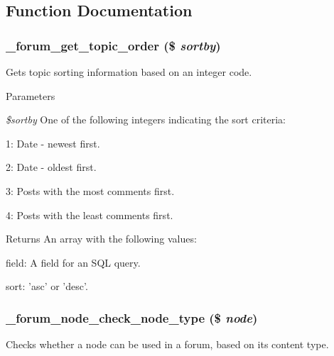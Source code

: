 \subsection{Function Documentation}
\hypertarget{forum_8module_af12b0115e4baa8f53be8041d7f0de0e4}{
\subsubsection[{\_\-forum\_\-get\_\-topic\_\-order}]{\setlength{\rightskip}{0pt plus 5cm}\_\-forum\_\-get\_\-topic\_\-order (\$ {\em sortby})}}
\label{forum_8module_af12b0115e4baa8f53be8041d7f0de0e4}
Gets topic sorting information based on an integer code.


\begin{DoxyParams}{Parameters}
\item[{\em \$sortby}]One of the following integers indicating the sort criteria:
\begin{DoxyItemize}
\item 1: Date -\/ newest first.
\item 2: Date -\/ oldest first.
\item 3: Posts with the most comments first.
\item 4: Posts with the least comments first.
\end{DoxyItemize}\end{DoxyParams}
\begin{DoxyReturn}{Returns}
An array with the following values:
\begin{DoxyItemize}
\item field: A field for an SQL query.
\item sort: 'asc' or 'desc'. 
\end{DoxyItemize}
\end{DoxyReturn}
\hypertarget{forum_8module_ab7c8bc1867b60dfb765b3cfd80a7e4b7}{
\subsubsection[{\_\-forum\_\-node\_\-check\_\-node\_\-type}]{\setlength{\rightskip}{0pt plus 5cm}\_\-forum\_\-node\_\-check\_\-node\_\-type (\$ {\em node})}}
\label{forum_8module_ab7c8bc1867b60dfb765b3cfd80a7e4b7}
Checks whether a node can be used in a forum, based on its content type.


